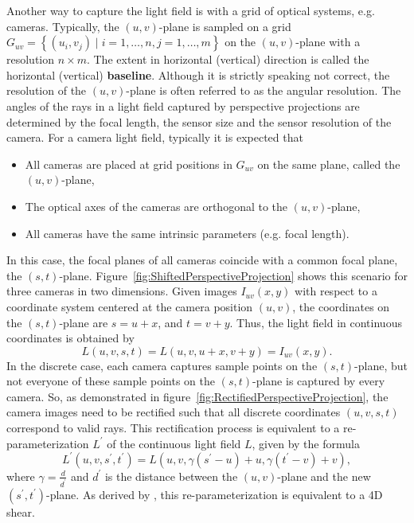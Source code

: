 Another way to capture the light field is with a grid of optical systems, e.g. cameras.
Typically, the $(u, v)$-plane is sampled on a grid $G_{uv} = \left \{ \left( u_i, v_j \right) \mid i = 1,\dots, n, j = 1, \dots, m\right \}$ on the $(u, v)$-plane with a resolution $n \times m$.
The extent in horizontal (vertical) direction is called the horizontal (vertical) \textbf{baseline}.
Although it is strictly speaking not correct, the resolution of the $(u, v)$-plane is often referred to as the angular resolution. 
The angles of the rays in a light field captured by perspective projections are determined by the focal length, the sensor size and the sensor resolution of the camera.
For a camera light field, typically it is expected that
\begin{itemize}
	\item All cameras are placed at grid positions in $G_{uv}$ on the same plane, called the $(u, v)$-plane, 
	\item The optical axes of the cameras are orthogonal to the $(u, v)$-plane, 
	\item All cameras have the same intrinsic parameters (e.g. focal length).
\end{itemize}
In this case, the focal planes of all cameras coincide with a common focal plane, the $(s, t)$-plane.
Figure~\ref{fig:ShiftedPerspectiveProjection} shows this scenario for three cameras in two dimensions.
Given images $I_{uv}(x, y)$ with respect to a coordinate system centered at the camera position $(u, v)$, the coordinates on the $(s, t)$-plane are $s = u + x$, and $t = v + y$.
Thus, the light field in continuous coordinates is obtained by 
\begin{equation}
	L(u, v, s, t) = L(u, v, u + x, v + y) = I_{uv}(x, y).
\end{equation}
In the discrete case, each camera captures sample points on the $(s, t)$-plane, but not everyone of these sample points on the $(s, t)$-plane is captured by every camera.
So, as demonstrated in figure~\ref*{fig:RectifiedPerspectiveProjection}, the camera images need to be rectified such that all discrete coordinates $(u, v, s, t)$ correspond to valid rays.
This rectification process is equivalent to a re-parameterization $L^\prime$ of the continuous light field $L$, given by the formula
\begin{equation}\label{eq:two_plane_reparameterization}
	L^\prime (u, v, s^\prime, t^\prime) = L \left(u, v, \gamma (s^\prime - u) + u, \gamma (t^\prime - v) + v \right), 
\end{equation}
where $\gamma = \frac{d}{d^\prime}$ and $d^\prime$ is the distance between the $(u, v)$-plane and the new \mbox{$(s^\prime, t^\prime)$-plane}.
As derived by \cite{DynamicallyReparameterizedLF}, this re-parameterization is equivalent to a 4D shear.

